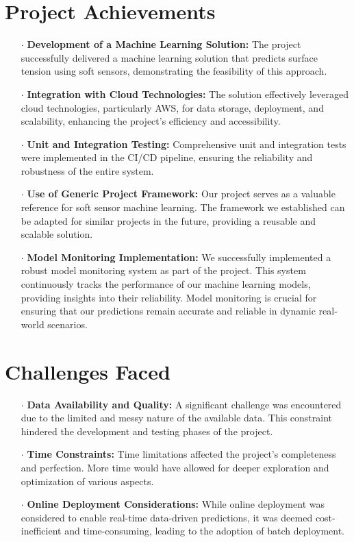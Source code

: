 \documentclass{report}
\begin{document}
\section{Project Achievements}
\begin{itemize}
  \item[$\cdot$] \textbf{Development of a Machine Learning Solution:} The project successfully delivered a machine learning solution that predicts surface tension using soft sensors, demonstrating the feasibility of this approach.
  
  \item[$\cdot$] \textbf{Integration with Cloud Technologies:} The solution effectively leveraged cloud technologies, particularly AWS, for data storage, deployment, and scalability, enhancing the project's efficiency and accessibility.
  
  \item[$\cdot$] \textbf{Unit and Integration Testing:} Comprehensive unit and integration tests were implemented in the CI/CD pipeline, ensuring the reliability and robustness of the entire system.
  
  \item[$\cdot$] \textbf{Use of Generic Project Framework:} Our project serves as a valuable reference for soft sensor machine learning. The framework we established can be adapted for similar projects in the future, providing a reusable and scalable solution.

  
  \item[$\cdot$] \textbf{Model Monitoring Implementation:}
    We successfully implemented a robust model monitoring system as part of the project. This system continuously tracks the performance of our machine learning models, providing insights into their reliability. Model monitoring is crucial for ensuring that our predictions remain accurate and reliable in dynamic real-world scenarios.

\end{itemize}

\section{Challenges Faced}
\begin{itemize}
  \item[$\cdot$] \textbf{Data Availability and Quality:} A significant challenge was encountered due to the limited and messy nature of the available data. This constraint hindered the development and testing phases of the project.
  
  \item[$\cdot$] \textbf{Time Constraints:} Time limitations affected the project's completeness and perfection. More time would have allowed for deeper exploration and optimization of various aspects.
  
  \item[$\cdot$] \textbf{Online Deployment Considerations:} While online deployment was considered to enable real-time data-driven predictions, it was deemed cost-inefficient and time-consuming, leading to the adoption of batch deployment.
\end{itemize}
\end{document}
